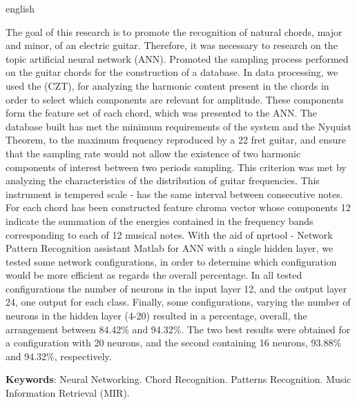 \begin{resumo}[Abstract]
 \begin{otherlanguage*}{english}
 

The goal of this research is to promote the recognition of natural chords, major and minor, of an electric guitar. Therefore, it was necessary to research on the topic artificial neural network (ANN). Promoted the sampling process performed on the guitar chords for the construction of a database. In data processing, we used the (CZT), for analyzing the harmonic content present in the chords in order to select which components are relevant for amplitude. These components form the feature set of each chord, which was presented to the ANN. The database built has met the minimum requirements of the system and the Nyquist Theorem, to the maximum frequency reproduced by a 22 fret guitar, and ensure that the sampling rate would not allow the existence of two harmonic components of interest between two periods sampling. This criterion was met by analyzing the characteristics of the distribution of guitar frequencies. This instrument is tempered scale - has the same interval between consecutive notes. For each chord has been constructed feature chroma vector whose components 12 indicate the summation of the energies contained in the frequency bands corresponding to each of 12 musical notes. With the aid of nprtool - Network Pattern Recognition assistant Matlab for ANN with a single hidden layer, we tested some network configurations, in order to determine which configuration would be more efficient as regards the overall percentage. In all tested configurations the number of neurons in the input layer 12, and the output layer 24, one output for each class. Finally, some configurations, varying the number of neurons in the hidden layer (4-20) resulted in a percentage, overall, the arrangement between 84.42\% and 94.32\%. The two best results were obtained for a configuration with 20 neurons, and the second containing 16 neurons, 93.88\% and 94.32\%, respectively.
 
 
   \vspace{\onelineskip}
 
   \noindent 
   \textbf{Keywords}: Neural Networking. Chord Recognition. Patterns Recognition. Music Information Retrieval (MIR).
 \end{otherlanguage*}
\end{resumo}
